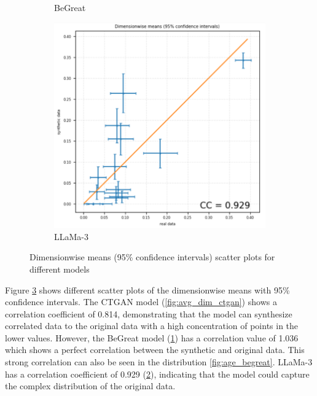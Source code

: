 \begin{figure}[H]
\begin{subfigure}[b]{0.45\textwidth}
        \caption{BeGreat}
        \label{fig:avg_dim_begreat}
    \end{subfigure}
    \hfill
    \begin{subfigure}[b]{0.48\textwidth}
        \centering
        \includegraphics[width=\textwidth]{images/avg_dim_llama.png}
        \caption{LLaMa-3}
        \label{fig:avg_dim_llama}
    \end{subfigure}
    \caption{Dimensionwise means (95\% confidence intervals) scatter plots for different models}
    \label{fig:dim_means_distrib}
\end{figure}

Figure \ref{fig:dim_means_distrib} shows different scatter plots of the dimensionwise means with 95\% confidence intervals. The CTGAN model (\ref{fig:avg_dim_ctgan}) shows a correlation coefficient of 0.814, demonstrating that the model can synthesize correlated data to the original data with a high concentration of points in the lower values. However, the BeGreat model (\ref{fig:avg_dim_begreat}) has a correlation value of 1.036 which shows a perfect correlation between the synthetic and original data. This strong correlation can also be seen in the distribution \ref{fig:age_begreat}. LLaMa-3 has a correlation coefficient of 0.929 (\ref{fig:avg_dim_llama}), indicating that the model could capture the complex distribution of the original data. 



